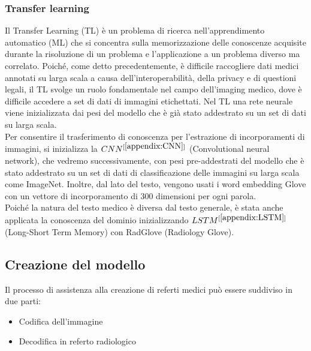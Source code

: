 \documentclass[12pt,a4paper]{report}
\begin{document}
\subsubsection{Transfer learning}
Il Transfer Learning (TL)\cite{singh2019chest} è un problema di ricerca nell'apprendimento automatico (ML) che si concentra sulla memorizzazione delle conoscenze acquisite durante la risoluzione di un problema e l'applicazione a un problema diverso ma correlato.
Poiché, come detto precedentemente, è difficile raccogliere dati medici annotati su larga scala a causa dell'interoperabilità, della privacy e di questioni legali, il TL svolge un ruolo fondamentale nel campo dell'imaging medico, dove è difficile accedere a set di dati di immagini etichettati. Nel TL una rete neurale viene inizializzata dai pesi del modello che è già stato addestrato su un set di dati su larga scala.\\
Per consentire il trasferimento di conoscenza per l'estrazione di incorporamenti di immagini, si inizializza la $CNN^{[\ref{appendix:CNN}]}$ (Convolutional neural network), che vedremo successivamente, con pesi pre-addestrati del modello che è stato addestrato su un set di dati di classificazione delle immagini su larga scala come ImageNet. Inoltre, dal lato del testo, vengono usati i word embedding Glove \cite{pennington2014glove} con un vettore di incorporamento di 300 dimensioni per ogni parola.\\
Poiché la natura del testo medico è diversa dal testo generale, è stata anche applicata la conoscenza del dominio inizializzando $LSTM^{[\ref{appendix:LSTM}]}$ (Long-Short Term Memory) con RadGlove (Radiology Glove)\cite{zhang2018learning}.

\subsection{Creazione del modello}
Il processo di assistenza alla creazione di referti medici può essere suddiviso in due parti:
\begin{itemize}
    \item Codifica dell’immagine
    \item Decodifica in referto radiologico
\end{itemize}
\end{document}
